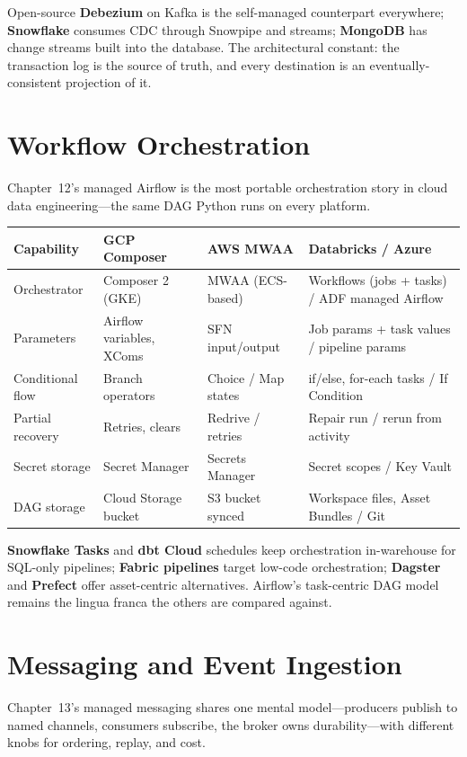 \noindent Open-source \textbf{Debezium} on Kafka is the self-managed counterpart everywhere;
\textbf{Snowflake} consumes CDC through Snowpipe and streams; \textbf{MongoDB} has change streams
built into the database. The architectural constant: the transaction log is the source of truth,
and every destination is an eventually-consistent projection of it.

\section{Workflow Orchestration}
%
Chapter~12's managed Airflow is the most portable orchestration story in cloud data
engineering---the same DAG Python runs on every platform.

\begin{center}
\footnotesize
\begin{tabular}{@{}p{2.8cm}p{3.0cm}p{3.0cm}p{3.4cm}@{}}
\toprule
\textbf{Capability} & \textbf{GCP Composer} & \textbf{AWS MWAA} & \textbf{Databricks / Azure} \\
\midrule
Orchestrator & Composer 2 (GKE) & MWAA (ECS-based) & Workflows (jobs + tasks) / ADF managed Airflow \\
Parameters & Airflow variables, XComs & SFN input/output & Job params + task values / pipeline params \\
Conditional flow & Branch operators & Choice / Map states & if/else, for-each tasks / If Condition \\
Partial recovery & Retries, clears & Redrive / retries & Repair run / rerun from activity \\
Secret storage & Secret Manager & Secrets Manager & Secret scopes / Key Vault \\
DAG storage & Cloud Storage bucket & S3 bucket synced & Workspace files, Asset Bundles / Git \\
\bottomrule
\end{tabular}
\end{center}

\noindent \textbf{Snowflake Tasks} and \textbf{dbt Cloud} schedules keep orchestration in-warehouse
for SQL-only pipelines; \textbf{Fabric pipelines} target low-code orchestration; \textbf{Dagster}
and \textbf{Prefect} offer asset-centric alternatives. Airflow's task-centric DAG model remains
the lingua franca the others are compared against.

\section{Messaging and Event Ingestion}
%
Chapter~13's managed messaging shares one mental model---producers publish to named channels,
consumers subscribe, the broker owns durability---with different knobs for ordering, replay, and
cost.


